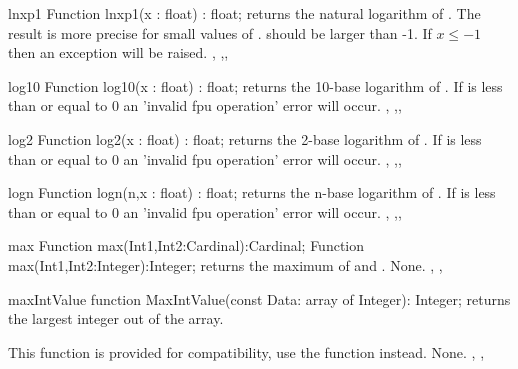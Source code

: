 \begin{function}{lnxp1}
\Declaration
Function lnxp1(x : float) : float;
\Description
{} returns the natural logarithm of . The result
is more precise for small values of .  should be larger
than -1.
\Errors
If $x\leq -1$ then an  exception will be raised.
\SeeAlso
{}, ,,
\end{function}


\begin{function}{log10}
\Declaration
Function log10(x : float) : float;
\Description
{} returns the 10-base logarithm of .
\Errors
If  is less than or equal to 0 an 'invalid fpu operation' error
will occur.
\SeeAlso
{}, ,,
\end{function}



\begin{function}{log2}
\Declaration
Function log2(x : float) : float;
\Description
{} returns the 2-base logarithm of .
\Errors
If  is less than or equal to 0 an 'invalid fpu operation' error
will occur.
\SeeAlso
{}, ,,
\end{function}



\begin{function}{logn}
\Declaration
Function logn(n,x : float) : float;
\Description
{} returns the n-base logarithm of .
\Errors
If  is less than or equal to 0 an 'invalid fpu operation' error
will occur.
\SeeAlso
{}, ,,
\end{function}


\begin{function}{max}
\Declaration
Function max(Int1,Int2:Cardinal):Cardinal;
Function max(Int1,Int2:Integer):Integer;
\Description
{} returns the maximum of  and .
\Errors
None.
\SeeAlso
{}, , 
\end{function}


\begin{function}{maxIntValue}
\Declaration
function MaxIntValue(const Data: array of Integer): Integer;
\Description
{} returns the largest integer out of the 
array.

This function is provided for \delphi compatibility, use the 
function instead.
\Errors
None.
\SeeAlso
{}, , 
\end{function}

